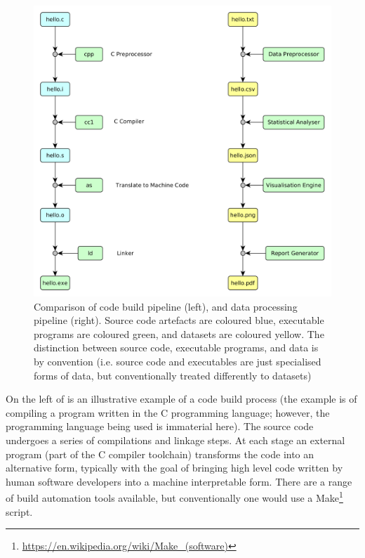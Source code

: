 \begin{figure}[h!]
\centering
\includegraphics[width=\linewidth]{figs/dag/simple-chain.png}
\caption{Comparison of code build pipeline (left), and data processing pipeline (right). Source code artefacts are coloured blue, executable programs are coloured green, and datasets are coloured yellow. The distinction between source code, executable programs, and data is by convention (i.e. source code and executables are just specialised forms of data, but conventionally treated differently to datasets)}
\label{fig:simple-chain-cmp}
\end{figure}

On the left of  is an illustrative example of a code build process (the example is of compiling a program written in the C programming language; however, the programming language being used is immaterial here). The source code undergoes a series of compilations and linkage steps. At each stage an external program (part of the C compiler toolchain) transforms the code into an alternative form, typically with the goal of bringing high level code written by human software developers into a machine interpretable form. There are a range of build automation tools available, but conventionally one would use a Make\footnote{\url{https://en.wikipedia.org/wiki/Make_(software)}} script.

